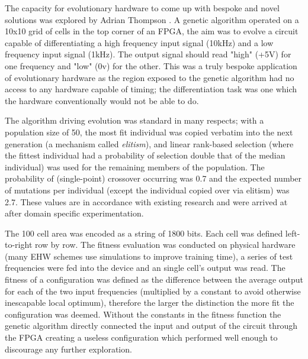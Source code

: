 The capacity for evolutionary hardware to come up with bespoke and novel solutions
was explored by Adrian Thompson \cite{10.1007/3-540-63173-9_61}. A genetic algorithm
operated on a 10x10 grid of cells in the top corner of an FPGA, the aim was to evolve
a circuit capable of differentiating a high frequency input signal (10kHz) and a
low frequency input signal (1kHz). The output signal should read "high" (+5V) for one frequency
and "low" (0v) for the other. This was a truly bespoke application of evolutionary
hardware as the region exposed to the genetic algorithm had no access to any
hardware capable of timing; the differentiation task was one which the hardware
conventionally would not be able to do.

The algorithm driving evolution was standard in many respects; with a population size of 50,
the most fit individual was copied verbatim into the next generation (a mechanism
called {\em elitism}), and linear rank-based selection (where the fittest
individual had a probability of selection double that of the median individual)
was used for the remaining members of the population. The probability of (single-point)
crossover occurring was 0.7 and the expected number of mutations per individual
(except the individual copied over via elitism) was 2.7. These values are in
accordance with existing research and were arrived at after domain specific
experimentation.

The 100 cell area was encoded as a string of 1800 bits. Each cell was defined
left-to-right row by row. The fitness evaluation was conducted on physical hardware
(many EHW schemes use simulations to improve training time), a series of test frequencies
were fed into the device and an single cell's output was read. The fitness of a configuration
was defined as the difference between the average output for each of the two input frequencies
(multiplied by a constant to avoid otherwise inescapable local optimum), therefore the larger
the distinction the more fit the configuration was deemed. Without the constants in the
fitness function the genetic algorithm directly connected the input and output of
the circuit through the FPGA creating a useless configuration which performed
well enough to discourage any further exploration.

